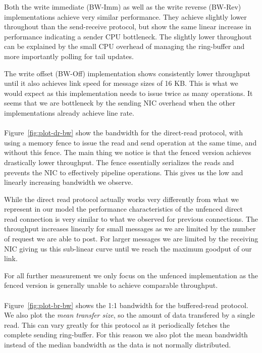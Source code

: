 Both the write immediate (BW-Imm) as well
as the write reverse (BW-Rev) implementations achieve very similar performance. They achieve slightly lower throughout
than the send-receive protocol, but show the same linear increase in performance indicating a sender CPU bottleneck. The
slightly lower throughout can be explained by the small CPU overhead of managing the ring-buffer and more importantly  
polling for tail updates.

The write offset (BW-Off) implementation shows consistently lower throughput until it also achieves
link speed for message sizes of 16 KB. This is what we would expect as this implementation needs to issue 
twice as many operations. It seems that we are bottleneck by the sending NIC overhead when the other
implementations already achieve line rate.

\paragraph{} Figure~\ref{fig:plot-dr-bw} show the bandwidth for the direct-read protocol, with using a memory fence
to issue the read and send operation at the same time, and without this fence.  The main thing we notice is that the 
fenced version achieves drastically lower throughput. The fence essentially serializes the reads and prevents the NIC 
to effectively pipeline operations. This gives us the low and linearly increasing bandwidth we observe.

While the direct read protocol actually works very differently from what we represent in our model the performance 
characteristics of the unfenced direct read connection is very similar to what we observed for previous connections. The
throughput increases linearly for small messages as we are limited by the number of request we are able to post. For larger
messages we are limited by the receiving NIC giving us this sub-linear curve until we reach the maximum goodput of our link.

For all further measurement we only focus on the unfenced implementation as the fenced version is generally unable
to achieve comparable throughput.


\paragraph{} Figure~\ref{fig:plot-br-bw} shows the 1:1 bandwidth for the buffered-read protocol. We also plot the 
\emph{mean transfer size}, so the amount of data transfered by a single read. 
This can vary greatly for this protocol as it periodically
fetches the complete sending ring-buffer. For this reason we also plot the mean bandwidth instead of the median bandwidth 
as the data is not normally distributed.

